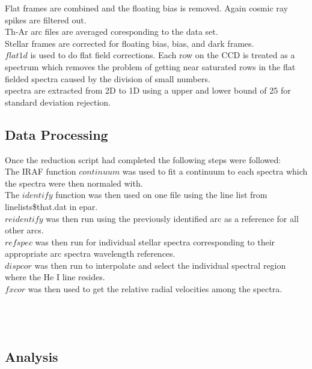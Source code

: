 \documentclass{article}
\begin{document}
Flat frames are combined and the floating bias is removed. Again cosmic ray spikes are filtered out.\\

Th-Ar arc files are averaged coresponding to the data set.\\

Stellar frames are corrected for floating bias, bias, and dark frames.\\

$flat1d$ is used to do flat field corrections. Each row on the CCD is treated as a spectrum which removes the problem of getting near saturated rows in the flat fielded spectra caused by the division of small numbers.\\

spectra are extracted from 2D to 1D using a upper and lower bound of 25 for standard deviation rejection.\\

\subsection{Data Processing}
Once the reduction script had completed the following steps were followed:\\

The IRAF function $continuum$ was used to fit a continuum to each spectra which the spectra were then normaled with.\\

The $identify$ function was then used on one file using the line list from linelists\$that.dat in epar.\\

$reidentify$ was then run using the previously identified arc as a reference for all other arcs.\\

$refspec$ was then run for individual stellar spectra corresponding to their appropriate arc spectra wavelength references.\\

$dispcor$ was then run to interpolate and select the individual spectral region where the He I line resides.\\

$fxcor$ was then used to get the relative radial velocities among the spectra.\\
\\
\\
\\
\subsection{Analysis}
\end{document}
